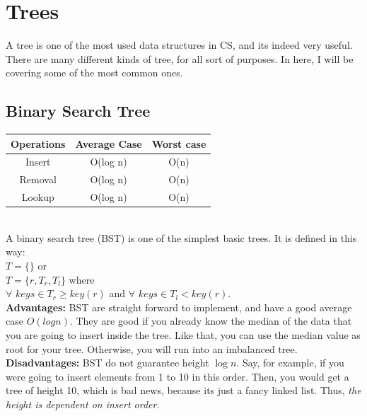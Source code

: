 \documentclass[a4paper]{article}
\begin{document}
\section{Trees} %
\label{sec:Trees}
A tree is one of the most used data structures in CS, and its indeed very useful. There are many different kinds of tree, for all sort of purposes. In here, I will be covering some of the most common ones.
\subsection{Binary Search Tree} %
\label{sub:Binary Search Tree}
\begin{tabular}{ | c | c | c |}
  \hline
  {\bf Operations } & {\bf Average Case} & {\bf Worst case}  \\
  \hline
  Insert & O(log n) & O(n)\\
  \hline
  Removal & O(log n) & O(n) \\
  \hline
  Lookup & O(log n) &O(n)  \\
  \hline
\end{tabular} \\

A binary search tree (BST) is one of the simplest basic trees. It is defined in this way:\\
$ T = \{\} $ or \\
$ T = \{r , T_r, T_l\}$ where \\
$\forall$ $keys \in T_r \geq key(r)$ and $ \forall$ $keys \in T_l < key(r)$.\\
{\bf Advantages:} BST are straight forward to implement, and have a good average case $O(log n)$. They are good if you already know the median of the data that you are going to insert inside the tree. Like that, you can use the median value as root for your tree. Otherwise, you will run into an imbalanced tree.\\
{\bf Disadvantages:} BST do not guarantee height $\log n$. Say, for example, if you were going to insert elements from 1 to 10 in this order. Then, you would get a tree of height 10, which is bad news, because its just a fancy linked list. Thus, \emph{ the height is dependent on insert order}.
% 
% 
\end{document}

